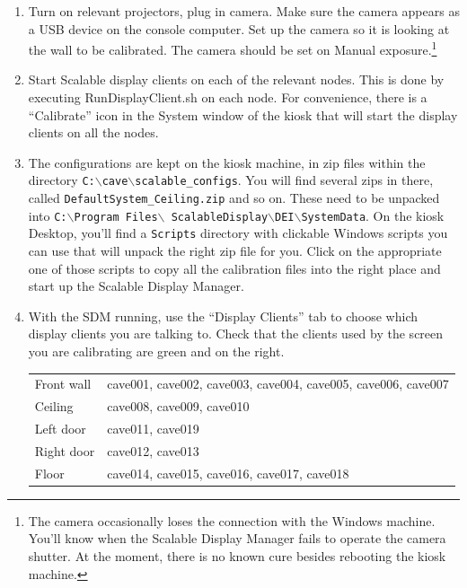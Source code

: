 \documentclass[11pt]{article}
\newcommand{\cmd}[1]{\texttt{#1}}
\begin{document}
\begin{enumerate}

\item Turn on relevant projectors, plug in camera.  Make sure the camera
  appears as a USB device on the console computer.  Set up the camera
  so it is looking at the wall to be calibrated.  The camera should be
  set on Manual exposure.\footnote{The camera occasionally loses the
    connection with the Windows machine.  You'll know when the
    Scalable Display Manager fails to operate the camera shutter.  At
    the moment, there is no known cure besides rebooting the kiosk
    machine.} 

\item Start Scalable display clients on each of the relevant nodes.
  This is done by executing RunDisplayClient.sh on each node.  For
  convenience, there is a ``Calibrate'' icon in the System window of
  the kiosk that will start the display clients on all the nodes.

\newcommand{\bs}{$\backslash$}
\item The configurations are kept on the kiosk machine, in zip files
  within the directory \hbox{\cmd{C:\bs cave\bs scalable\_configs}}.  You will find several zips in
  there, called \cmd{DefaultSystem\_Ceiling.zip} and so on.  These need to be
  unpacked into \hbox{\cmd{C:\bs Program Files\bs
      ScalableDisplay\bs DEI\bs SystemData}}.  On the kiosk Desktop,
  you'll find a \cmd{Scripts} directory with clickable Windows scripts
  you can use that will unpack the right zip file for you.  Click on
  the appropriate one of 
  those scripts to copy all the calibration files into the right
  place and start up the Scalable Display Manager.

\item With the SDM running, use the ``Display Clients'' tab to choose
  which display clients you are talking to.  Check that the clients
  used by the screen you are calibrating are 
  green and on the right. 

  \begin{center}
  \begin{tabular}{ll}
    Front wall & cave001, cave002, cave003, cave004, cave005, cave006,
                 cave007 \\
    Ceiling & cave008, cave009, cave010 \\
    Left door & cave011, cave019 \\
    Right door & cave012, cave013 \\
    Floor & cave014, cave015, cave016, cave017, cave018 \\ 
  \end{tabular}
\end{center}


\end{enumerate}
\end{document}
